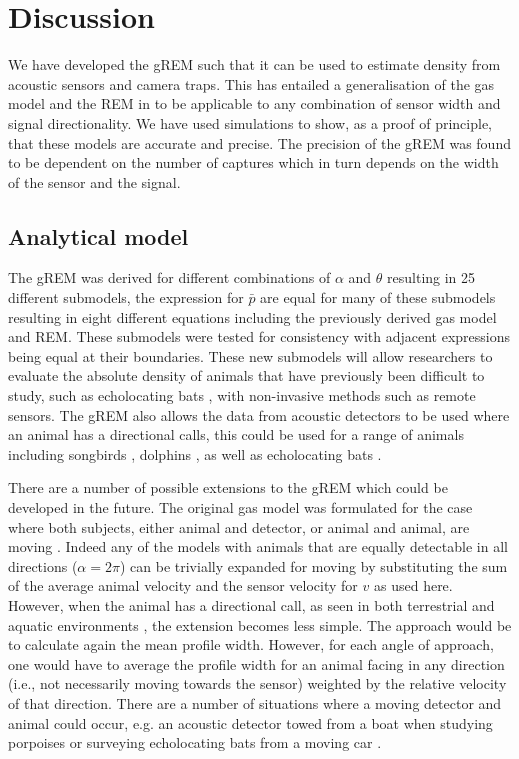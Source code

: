 \documentclass[a4paper,10pt,reqno,oneside]{amsart}
\begin{document}
                  
                  
\section*{Discussion}

We have developed the gREM such that it can be used to estimate density from acoustic sensors and camera traps. This has entailed a generalisation of the gas model and the REM in \citet{rowcliffe2008estimating} to be applicable to any combination of sensor width and signal directionality. We have used simulations to show, as a proof of principle, that these models are accurate and precise. The precision of the gREM was found to be dependent on the number of captures which in turn depends on the width of the sensor and the signal.

\subsection*{Analytical model}
The gREM was derived for different combinations of $\alpha$ and $\theta$ resulting in 25 different submodels, the expression for $\bar{p}$ are equal for many of these submodels resulting in eight different equations including the previously derived gas model and REM. These submodels were tested for consistency with adjacent expressions being equal at their boundaries. These new submodels will allow researchers to evaluate the absolute density of animals that have previously been difficult to study, such as echolocating bats \citep{clement2013estimating}, with non-invasive methods such as remote sensors. The gREM also allows the data from acoustic detectors to be used where an animal has a directional calls, this could be used for a range of animals including songbirds \citep{blumstein2011acoustic}, dolphins \citep{lammers2003directionality}, as well as echolocating bats \citep{walters2013challenges}. 

There are a number of possible extensions to the gREM which could be developed in the future. The original gas model was formulated for the case where both subjects, either animal and detector, or animal and animal, are moving \citep{Hutchinson_Waser_2007}. Indeed any of the models with animals that are equally detectable in all directions ($\alpha = 2\pi$) can be trivially expanded for moving by substituting the sum of the average animal velocity and the sensor velocity for $v$ as used here. However, when the animal has a directional call, as seen in both terrestrial and aquatic environments \citep{lammers2003directionality,blumstein2011acoustic}, the extension becomes less simple. The approach would be to calculate again the mean profile width. However, for each angle of approach, one would have to average the profile width for an animal facing in any direction (i.e., not necessarily moving towards the sensor) weighted by the relative velocity of that direction. There are a number of situations where a moving detector and animal could occur, e.g. an acoustic detector towed from a boat when studying porpoises \citep{kimura2014acoustic} or surveying echolocating bats from a moving car \citep{ahlen1999use, jones2011indicator}. 
\end{document}

